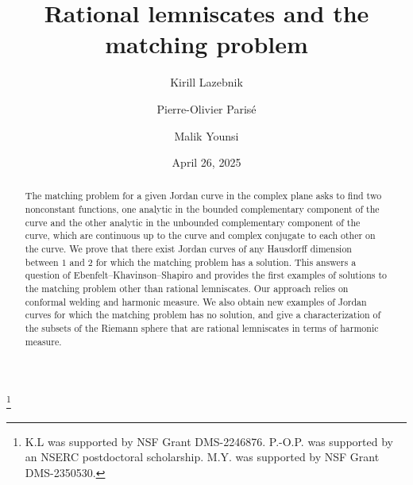 \documentclass{amsart}
\theoremstyle{plain}
\theoremstyle{definition}
\theoremstyle{remark}
\begin{document}
\title{Rational lemniscates and the matching problem}

\date{April 26, 2025}

\author[K. Lazebnik]{Kirill Lazebnik}
\address{Mathematical Sciences, University of Texas at Dallas, Richardson, Texas 75080-3021, USA.}

\author[P.-O. Paris\'e]{Pierre-Olivier Paris\'e}
\address{D\'epartement de math\'ematiques et d'informatique, Universit\'e du Qu\'ebec \`a Trois-Rivi\`eres, Trois-Rivi\`eres, Qu\'ebec G8Z 4M3, Canada}


\author[M. Younsi]{Malik Younsi}
\address{Department of Mathematics, University of Hawaii Manoa, Honolulu, HI 96822, USA.}


\thanks{K.L was supported by NSF Grant DMS-2246876. 
P.-O.P. was supported by an NSERC postdoctoral scholarship. M.Y. was supported by NSF Grant DMS-2350530.}










\begin{abstract}
The matching problem for a given Jordan curve in the complex plane asks to find two nonconstant functions, one analytic in the bounded complementary component of the curve and the other analytic in the unbounded complementary component of the curve, which are continuous up to the curve and complex conjugate to each other on the curve. We prove that there exist Jordan curves of any Hausdorff dimension between $1$ and $2$ for which the matching problem has a solution. This answers a question of Ebenfelt--Khavinson--Shapiro and provides the first examples of solutions to the matching problem other than rational lemniscates. Our approach relies on conformal welding and harmonic measure. We also obtain new examples of Jordan curves for which the matching problem has no solution, and give a characterization of the subsets of the Riemann sphere that are rational lemniscates in terms of harmonic measure.
\end{abstract}

\maketitle
\end{document}

